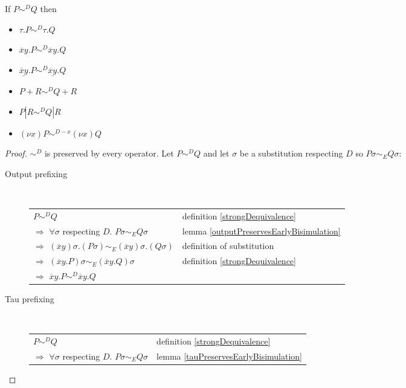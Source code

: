 \begin{lemma}\label{stringDEquivalencePreservedByAllExceptInput}
      If $P \sim^{D} Q$ then 
      \begin{itemize}
	\item 
	  $\tau.P \sim^{D} \tau.Q$
	\item 
	  $\overline{x}y.P \sim^{D} \overline{x}y.Q$
	\item 
	  $\underline{\overline{x}y}.P \sim^{D} \underline{\overline{x}y}.Q$
	\item
	  $P+R \sim^{D} Q+R$
	\item
	  $P|R \sim^{D} Q|R$
	\item
	  $(\nu x)P \sim^{D-x} (\nu x)Q$
      \end{itemize}
  \begin{proof}
    $\sim^{D}$ is preserved by every operator. Let $P \sim^{D} Q$ and let $\sigma$ be a substitution respecting $D$ so $P\sigma \sim_{E} Q\sigma$:
    \begin{description}
      \item[Output prefixing]\hfill \\
	\begin{center}
	  \begin{tabular}{ll}
	      $P \sim^{D} Q$
	    &
	      definition \ref{strongDequivalence}
	  \\
	      $\Rightarrow$ $\forall \sigma$ respecting $D.$ $P\sigma \sim_{E} Q\sigma$
	    &
	      lemma \ref{outputPreservesEarlyBisimulation}
	  \\
	      $\Rightarrow$ $(\overline{x}y)\sigma.(P\sigma) \sim_{E} (\overline{x}y)\sigma.(Q\sigma)$
	    &
	      definition of substitution
	  \\
	      $\Rightarrow$ $(\overline{x}y.P)\sigma \sim_{E} (\overline{x}y.Q)\sigma$
	    &
	      definition \ref{strongDequivalence}
	  \\
	      $\Rightarrow$ $\overline{x}y.P \sim^{D} \overline{x}y.Q$
	    &
	  \end{tabular}
	\end{center}
      \item[Tau prefixing]\hfill \\
	\begin{center}
	  \begin{tabular}{ll}
	      $P \sim^{D} Q$
	    &
	      definition \ref{strongDequivalence}
	  \\
	      $\Rightarrow$ $\forall \sigma$ respecting $D.$ $P\sigma \sim_{E} Q\sigma$
	    &
	      lemma \ref{tauPreservesEarlyBisimulation}

\end{tabular}
\end{center}
\end{description}
\end{proof}
\end{lemma}

